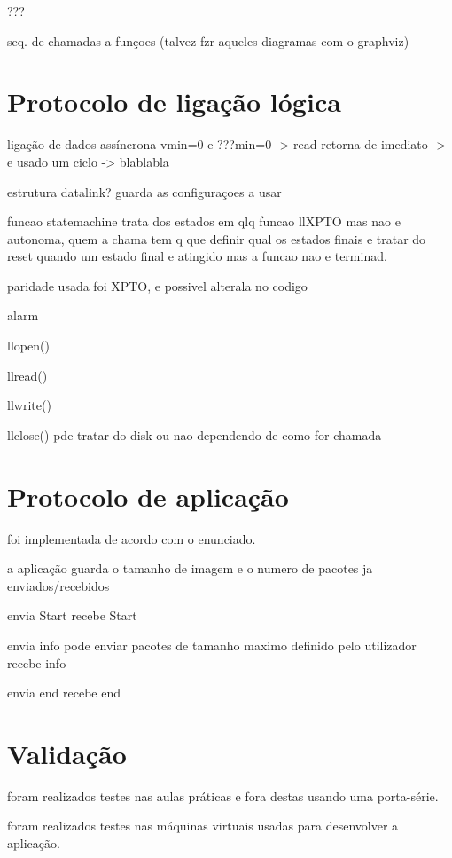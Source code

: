 \documentclass[11pt,a4paper,reqno]{report}
\numberwithin{equation}{section}
\begin{document}
???

seq. de chamadas a funçoes (talvez fzr aqueles diagramas com o graphviz)

\chapter{Protocolo de ligação lógica}

ligação de dados assíncrona
vmin=0 e ???min=0 -> read retorna de imediato -> e usado um ciclo -> blablabla

estrutura datalink? guarda as configuraçoes a usar

funcao statemachine trata dos estados em qlq funcao llXPTO mas nao e autonoma, quem a chama tem q que definir qual os estados finais e tratar do reset quando um estado final e atingido mas a funcao nao e terminad.

paridade usada foi XPTO, e possivel alterala no codigo

alarm

llopen()

llread()

llwrite()

llclose() pde tratar do disk ou nao dependendo de como for chamada

\chapter{Protocolo de aplicação}

foi implementada de acordo com o enunciado.

a aplicação guarda o tamanho de imagem e o numero de pacotes ja enviados/recebidos

envia Start
recebe Start

envia info pode enviar pacotes de tamanho maximo definido pelo utilizador
recebe info

envia end
recebe end

\chapter{Validação}

foram realizados testes nas aulas práticas e fora destas usando uma porta-série.

foram realizados testes nas máquinas virtuais usadas para desenvolver a aplicação.
\end{document}
